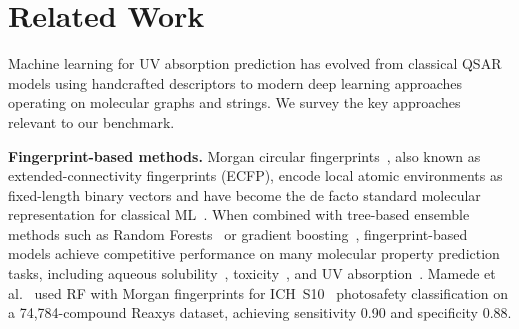 \documentclass[journal=jcisd8,manuscript=article]{achemso}
\begin{document}
\FloatBarrier
\section{Related Work}
\label{sec:related_work}

Machine learning for UV absorption prediction has evolved from classical QSAR models using handcrafted descriptors to modern deep learning approaches operating on molecular graphs and strings.
We survey the key approaches relevant to our benchmark.

\textbf{Fingerprint-based methods.}
Morgan circular fingerprints~\cite{rogers2010extended}, also known as extended-connectivity fingerprints (ECFP), encode local atomic environments as fixed-length binary vectors and have become the de facto standard molecular representation for classical ML~\cite{wuMoleculeNet2018}.
When combined with tree-based ensemble methods such as Random Forests~\cite{breiman2001random} or gradient boosting~\cite{chen2016xgboost}, fingerprint-based models achieve competitive performance on many molecular property prediction tasks, including aqueous solubility~\cite{delaney2004esol, panapitiya2022evaluation}, toxicity~\cite{mayr2016deeptox}, and UV absorption~\cite{mamede2021machine}.
Mamede et al.~\cite{mamede2021machine} used RF with Morgan fingerprints for ICH~S10~\cite{ICH2013S10} photosafety classification on a 74,784-compound Reaxys dataset, achieving sensitivity 0.90 and specificity 0.88.
\end{document}
